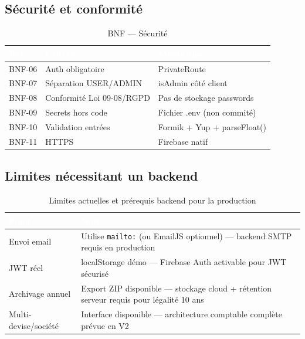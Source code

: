 \subsection{Sécurité et conformité}

\begin{table}[H]
\centering
\caption{BNF — Sécurité}
\label{tab:bnf_secu}
\begin{tabularx}{\textwidth}{|l|X|l|}
\hline
\rowcolor{emsiblue}\textcolor{white}{\textbf{Réf.}} & \textcolor{white}{\textbf{Critère}} & \textcolor{white}{\textbf{Mécanisme}} \\
\hline
BNF-06 & Auth obligatoire & PrivateRoute \\
BNF-07 & Séparation USER/ADMIN & isAdmin côté client \\
BNF-08 & Conformité Loi 09-08/RGPD & Pas de stockage passwords \\
BNF-09 & Secrets hors code & Fichier .env (non commité) \\
BNF-10 & Validation entrées & Formik + Yup + parseFloat() \\
BNF-11 & HTTPS & Firebase natif \\
\hline
\end{tabularx}
\end{table}

\subsection{Limites nécessitant un backend}

\begin{table}[H]
\centering
\caption{Limites actuelles et prérequis backend pour la production}
\label{tab:limites_backend}
\begin{tabularx}{\textwidth}{|l|X|}
\hline
\rowcolor{emsiblue}\textcolor{white}{\textbf{Point}} & \textcolor{white}{\textbf{Note}} \\
\hline
Envoi email & Utilise \texttt{mailto:} (ou EmailJS optionnel) — backend SMTP requis en production \\
JWT réel & localStorage démo — Firebase Auth activable pour JWT sécurisé \\
Archivage annuel & Export ZIP disponible — stockage cloud + rétention serveur requis pour légalité 10 ans \\
Multi-devise/société & Interface disponible — architecture comptable complète prévue en V2 \\
\hline
\end{tabularx}
\end{table}

